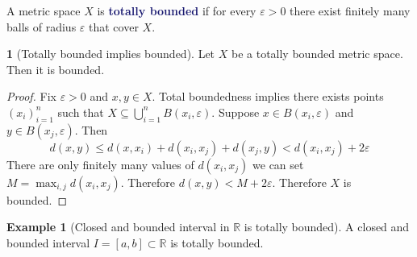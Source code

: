 \documentclass[11pt]{article}
\numberwithin{equation}{section}
\newcommand{\navy}[1]{\textcolor{MidnightBlue}{\bf #1}}
\theoremstyle{definition}
\newtheorem{claim}{\color{ForestGreen}{\textbf{Claim}}}[section]
\theoremstyle{definition}
\newtheorem{example}{\color{WildStrawberry}Example}[section]
\newcommand{\1}{\mathbbm 1}
\newcommand{\e}{\varepsilon}
\newcommand{\RR}{\mathbb R}
\begin{document}
\begin{definition}
	A metric space $X$ is \navy{totally bounded} if for every $\e > 0$ there exist finitely many balls of radius $\e$ that cover $X$. 
\end{definition}

\begin{claim}[Totally bounded implies bounded]
	Let $X$ be a totally bounded metric space. Then it is bounded. 
\end{claim}
\begin{proof}
	Fix $\e > 0$ and $x,y \in X$. Total boundedness implies there exists points $(x_i)_{i=1}^n$ such that $X \subseteq \bigcup_{i=1}^n B(x_i, \e)$. Suppose $x \in B(x_i,\e)$ and $y \in B(x_j,\e)$. Then 
	\begin{equation}
	 	d(x,y) \leq d(x,x_i) + d(x_i, x_j) + d(x_j,y) < d(x_i, x_j) + 2\e
	 \end{equation} 
	 There are only finitely many values of $d(x_i, x_j)$ we can set $M = \max_{i,j} d(x_i, x_j)$. Therefore $d(x,y) < M + 2\e$. Therefore $X$ is bounded. 
\end{proof}


\begin{example}[Closed and bounded interval in $\RR$ is totally bounded]
	A closed and bounded interval $I = [a,b] \subset \RR$ is totally bounded. 
\end{example}
\end{document}
